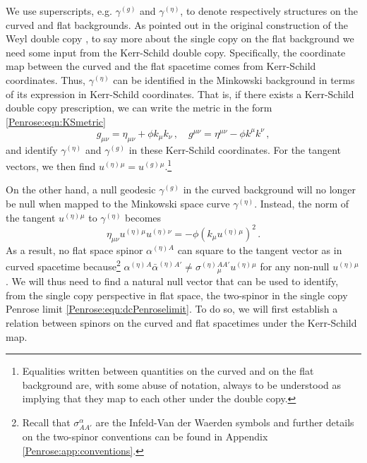 We use superscripts, e.g. $\gamma^{(g)}$ and $\gamma^{(\eta)}$, to denote respectively structures on the curved and flat backgrounds. As pointed out in the original construction of the Weyl double copy \cite{Luna:2018dpt}, to say more about the single copy on the flat background we need some input from the Kerr-Schild double copy. Specifically, the coordinate map between the curved and the flat spacetime comes from Kerr-Schild coordinates. Thus, $\gamma^{(\eta)}$ can be identified in the Minkowski background in terms of its expression in Kerr-Schild coordinates. That is, if there exists a Kerr-Schild double copy prescription, we can write the metric in the form \eqref{Penrose:eqn:KSmetric}
\begin{equation}
g_{\mu \nu} = \eta_{\mu \nu} + \phi k_{\mu} k_{\nu} \, , \quad  g^{\mu \nu} = \eta^{\mu \nu} - \phi k^{\mu} k^{\nu}  \, ,
\end{equation}
and identify $\gamma^{(\eta)}$ and  $\gamma^{(g)}$ in these Kerr-Schild coordinates. For the tangent vectors, we then find $u^{(\eta)}{}^{\mu} = u^{(g)}{}^{\mu}$.\footnote{Equalities written between quantities on the curved and on the flat background are, with some abuse of notation, always to be understood as implying that they map to each other under the double copy.}

On the other hand, a null geodesic  $\gamma^{(g)}$ in the curved background will no longer be null when mapped to the Minkowski space curve $\gamma^{(\eta)}$. Instead, the norm of the tangent $u^{(\eta)}{}^{\mu}$ to $\gamma^{(\eta)}$ becomes
\begin{equation}\label{Penrose:eqn:flatmass}
\eta_{\mu \nu} u^{(\eta)}{}^{\mu} u^{(\eta)}{}^{\nu} = - \phi \left(k_{\mu} u^{(\eta)}{}^{\mu}\right)^2 \, .
\end{equation}
As a result, no flat space spinor $\alpha^{(\eta)}{}^A$ can square to the tangent vector as in curved spacetime because\footnote{Recall that $\sigma^{\alpha}_{AA'}$ are the Infeld-Van der Waerden symbols and further details on the two-spinor conventions can be found in Appendix \ref{Penrose:app:conventions}.} $\alpha^{(\eta)}{}^A \bar{\alpha}^{(\eta)}{}^{A'} \neq \sigma^{(\eta)}{}{}^{AA'}_{\mu} u^{(\eta)}{}^{\mu}$ for any non-null $u^{(\eta)}{}^{\mu}$. We will thus need to find a natural null vector that can be used to identify, from the single copy perspective in flat space, the two-spinor in the single copy Penrose limit \eqref{Penrose:eqn:dcPenroselimit}. To do so, we will first establish a relation between spinors on the curved and flat spacetimes under the Kerr-Schild map.

